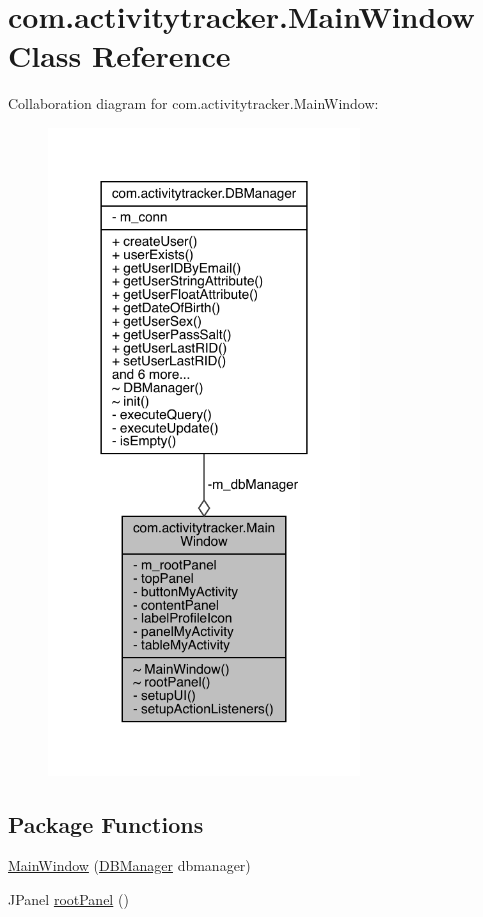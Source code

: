 \hypertarget{classcom_1_1activitytracker_1_1_main_window}{}\section{com.\+activitytracker.\+Main\+Window Class Reference}
\label{classcom_1_1activitytracker_1_1_main_window}


Collaboration diagram for com.\+activitytracker.\+Main\+Window\+:
\nopagebreak
\begin{figure}[H]
\begin{center}
\leavevmode
\includegraphics[width=234pt]{classcom_1_1activitytracker_1_1_main_window__coll__graph}
\end{center}
\end{figure}
\subsection*{Package Functions}
\begin{DoxyCompactItemize}
\item 
\mbox{\hyperlink{classcom_1_1activitytracker_1_1_main_window_ae6bdfbe608d54293b9102ca3fe6cdcdc}{Main\+Window}} (\mbox{\hyperlink{classcom_1_1activitytracker_1_1_d_b_manager}{D\+B\+Manager}} dbmanager)
\item 
J\+Panel \mbox{\hyperlink{classcom_1_1activitytracker_1_1_main_window_a62e9c6f477ccc5b93aff33abb567fde4}{root\+Panel}} ()
\end{DoxyCompactItemize}
